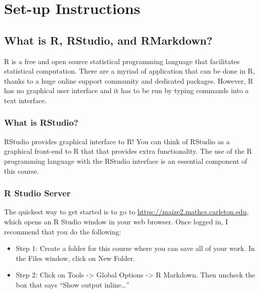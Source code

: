 \documentclass[
]{book}
\providecommand{\tightlist}{%
  \setlength{\itemsep}{0pt}\setlength{\parskip}{0pt}}
\begin{document}
\hypertarget{part-set-up-instructions}{%
\part*{Set-up Instructions}\label{part-set-up-instructions}}

\hypertarget{rstudio}{%
\chapter{What is R, RStudio, and RMarkdown?}\label{rstudio}}

R is a free and open source statistical programming language that facilitates statistical computation. There are a myriad of application that can be done in R, thanks to a huge online support community and dedicated packages. However, R has no graphical user interface and it has to be run by typing commands into a text interface.

\hypertarget{what-is-rstudio}{%
\section{What is RStudio?}\label{what-is-rstudio}}

RStudio provides graphical interface to R! You can think of RStudio as a graphical front-end to R that that provides extra functionality. The use of the R programming language with the RStudio interface is an essential component of this course.

\hypertarget{r-studio-server}{%
\section{R Studio Server}\label{r-studio-server}}

The quickest way to get started is to go to \url{https://maize2.mathcs.carleton.edu}, which opens an R Studio window in your web browser. Once logged in, I recommend that you do the following:

\begin{itemize}
\tightlist
\item
  Step 1: Create a folder for this course where you can save all of your work. In the Files window, click on New Folder.
\item
  Step 2: Click on Tools -\textgreater{} Global Options -\textgreater{} R Markdown. Then uncheck the box that says ``Show output inline\ldots{}''
\end{itemize}
\end{document}
